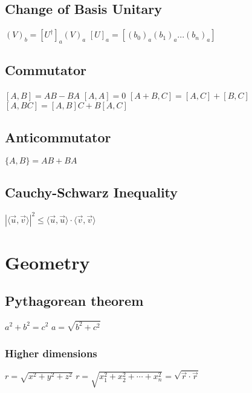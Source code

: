 \subsection{Change of Basis Unitary}	
\begin{itemize}	
\itemt \( (V)_b = [U^\dagger]_a (V)_a \)				
\itemt \( [U]_a = [(b_0)_a(b_1)_a ... (b_n)_a] \)				
\end{itemize}				

\subsection{Commutator}		
\begin{itemize}
\itemt \( [A,B] = AB - BA \)
\itemt \( [A,A] = 0 \)
\itemt \( [A+B,C] = [A,C]+[B,C] \)
\itemt \( [A,BC] = [A,B]C+B[A,C] \)
\end{itemize}			


\subsection{Anticommutator}
\begin{itemize}
\itemt \( \{A,B\} = AB + BA \)
\end{itemize}			


\subsection{Cauchy-Schwarz Inequality}
\begin{itemize}
\itemt \( |\langle \vec{u},\vec{v} \rangle|^2 \leq \langle \vec{u},\vec{u} \rangle \cdot \langle \vec{v},\vec{v} \rangle \)
\end{itemize}



	\section{Geometry}


		\subsection{Pythagorean theorem}
\begin{itemize}
\itemt \( a^2 + b^2 = c^2 \)
\itemt \( a = \sqrt{b^2 + c^2} \)
\end{itemize}

\subsubsection{Higher dimensions}
\begin{itemize}
\itemt \( r = \sqrt{x^2 + y^2 +z^2} \)
\itemt \( r = \sqrt{x_1^2 + x_2^2 + \cdots + x_n^2} = \sqrt{\vec{r}\cdot\vec{r}} \)
\end{itemize}

